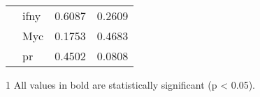 \begin{table}[htpb]
\begin{threeparttable}
\begin{tabular}{llrc}
                                                                           & \gls{ifny} & 0.6087     & 0.2609 \\
                                                                           & Myc        & 0.1753     & 0.4683 \\
                                                                           & \gls{pr}   & 0.4502     & 0.0808 \\
				\hline
				\hline
			\end{tabular}
			\begin{tablenotes}
				\begin{footnotesize}
				\item [1] All values in bold are statistically significant (p \textless{} 0.05).
				\end{footnotesize}
			\end{tablenotes}
		\end{threeparttable}
	\end{table}

